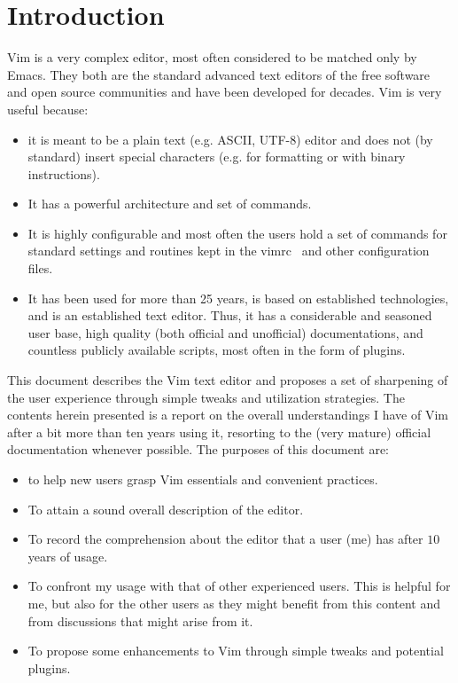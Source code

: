 \documentclass{article}
\begin{document}
\section{Introduction}\label{intro}
Vim is a very complex editor,
most often considered to be
matched only by Emacs.
They both are the standard advanced text editors
of the free software and open source communities
and have been developed for decades.
Vim is very useful because:
\begin{itemize}
  \item it is meant to be a plain text (e.g. ASCII, UTF-8) editor
  and does not (by standard) insert special characters (e.g. for
    formatting or with binary instructions).
  \item It has a powerful architecture and set of commands.
  \item It is highly configurable and most often the users
  hold a set of commands for standard settings and routines kept in
    the vimrc~\cite{vimrc} and other configuration files.
  \item It has been used for more than 25 years, is based on
    established technologies, and is an established text editor.
    Thus, it has a considerable and seasoned user
    base, high quality (both official and unofficial) documentations, 
    and countless publicly available scripts, most often in the form of
    plugins.
\end{itemize}

This document describes the Vim text editor
and proposes a set of sharpening of the user
experience through simple tweaks
and utilization strategies.
The contents herein presented is a
report on the overall understandings I
have of Vim after a bit more
than ten years using it,
resorting to the (very mature) official documentation
whenever possible.
The purposes of this document are:
\begin{itemize}
  \item to help new users grasp Vim essentials
  and convenient practices.
  \item To attain a sound overall description of the editor.
  \item To record the comprehension about the editor that
  a user (me) has after $10$ years of usage.
  \item To confront my usage with that of other experienced
  users. This is helpful for me, but also for the other users
  as they might benefit from this content and from discussions
  that might arise from it.
  \item To propose some enhancements to Vim through simple tweaks and potential plugins.
\end{itemize}
\end{document}
